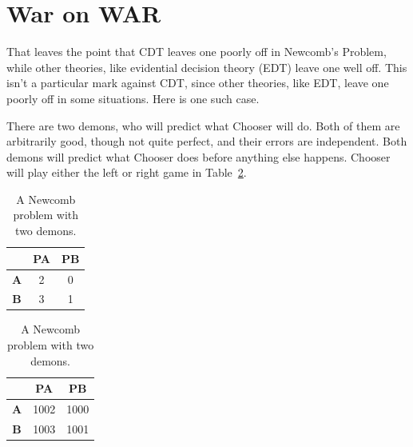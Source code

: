 \documentclass[
  12pt,
  letterpaper,
  DIV=11,
  numbers=noendperiod]{scrreprt}
\begin{document}
\hypertarget{sec-war-on-war}{%
\section{War on WAR}\label{sec-war-on-war}}

That leaves the point that CDT leaves one poorly off in Newcomb's
Problem, while other theories, like evidential decision theory (EDT)
leave one well off. This isn't a particular mark against CDT, since
other theories, like EDT, leave one poorly off in some situations. Here
is one such case.

There are two demons, who will predict what Chooser will do. Both of
them are arbitrarily good, though not quite perfect, and their errors
are independent. Both demons will predict what Chooser does before
anything else happens. Chooser will play either the left or right game
in Table~\ref{tbl-edt-war}.

\begin{table}

\caption{\label{tbl-edt-war}A Newcomb problem with two
demons.}\begin{minipage}[t]{0.50\linewidth}

{\centering 

\begin{tabular}[t]{ccc}
\toprule
 & \textbf{PA} & \textbf{PB}\\
\midrule
\textbf{A} & 2 & 0\\
\textbf{B} & 3 & 1\\
\bottomrule
\end{tabular}

}

\end{minipage}%
%
\begin{minipage}[t]{0.50\linewidth}

{\centering 

\begin{tabular}[t]{ccc}
\toprule
 & \textbf{PA} & \textbf{PB}\\
\midrule
\textbf{A} & 1002 & 1000\\
\textbf{B} & 1003 & 1001\\
\bottomrule
\end{tabular}

}

\end{minipage}%

\end{table}
\end{document}
